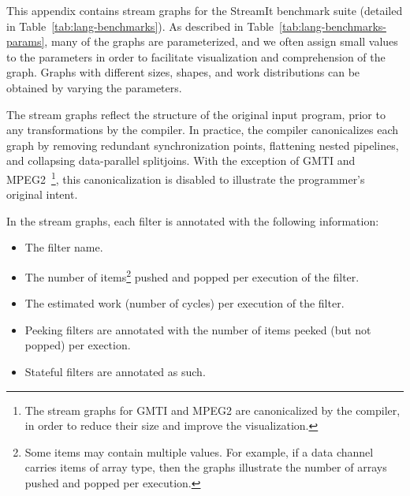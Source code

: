 \label{chap:stream-graphs}

\vspace{-\baselineskip}
This appendix contains stream graphs for the StreamIt benchmark suite
(detailed in Table~\ref{tab:lang-benchmarks}).  As described in
Table~\ref{tab:lang-benchmarks-params}, many of the graphs are
parameterized, and we often assign small values to the parameters in
order to facilitate visualization and comprehension of the graph.
Graphs with different sizes, shapes, and work distributions can be
obtained by varying the parameters.

The stream graphs reflect the structure of the original input program,
prior to any transformations by the compiler.  In practice, the
compiler canonicalizes each graph by removing redundant
synchronization points, flattening nested pipelines, and collapsing
data-parallel splitjoins.  With the exception of GMTI and
MPEG2~\footnote{The stream graphs for GMTI and MPEG2 are canonicalized
  by the compiler, in order to reduce their size and improve the
  visualization.}, this canonicalization is disabled to illustrate the
programmer's original intent.

In the stream graphs, each filter is annotated with the following
information:
\begin{itemize}

\item The filter name.\vspace{-3pt}

\item The number of items\footnote{Some items may contain multiple
  values.  For example, if a data channel carries items of array type,
  then the graphs illustrate the number of arrays pushed and popped
  per execution.} pushed and popped per execution of the filter.\vspace{-3pt}

\item The estimated work (number of cycles) per execution of the filter.\vspace{-3pt}

\item Peeking filters are annotated with the number of items peeked (but not popped) per exection.\vspace{-3pt}

\item Stateful filters are annotated as such.

\end{itemize}

